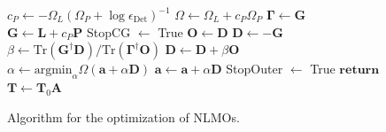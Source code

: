 \documentclass[aps,prl,reprint,amsmath,amssymb]{revtex4-1}
\begin{document}
\begin{figure}
\begin{algorithm}[H]
\begin{algorithmic}[1]
				\State $c_{P} \gets - \Omega_{L}(\Omega_P + \log \epsilon_{\text{Det}})^{-1}$ 
			\EndIf
			\State $\Omega \gets \Omega_{L} + c_P \Omega_{P} $ 
				\State $\mathbf{\Gamma} \gets \mathbf{G}$ 
			\EndIf 
			\State $\mathbf{G} \gets \mathbf{L} + c_P \mathbf{P} $ 
				\State StopCG $\gets$ True
			\EndIf
					\State $\mathbf{O} \gets \mathbf{D}$ 
				\EndIf
				\State $\mathbf{D} \gets - \mathbf{G}$ 
					\State $\beta \gets \text{Tr}(\mathbf{G}^{\dagger} \mathbf{D})/\text{Tr}(\mathbf{\Gamma}^{\dagger}\mathbf{O})$
					\State $\mathbf{D} \gets \mathbf{D} + \beta \mathbf{O}$ 
				\EndIf 
				\State $\alpha \gets \text{argmin}_{\alpha} \Omega(\mathbf{a} + \alpha \mathbf{D})$ 
				\State $\mathbf{a}\gets \mathbf{a} + \alpha \mathbf{D}$ 
			\EndIf
			\State StopOuter $\gets$ True
		\EndIf
	\State $\mathbf{return}$ $\mathbf{T} \gets \mathbf{T}_0 \mathbf{A} $ 
   \end{algorithmic}
\end{algorithm}
\caption{\label{fig:cg} Algorithm for the optimization of NLMOs.}
\end{figure}
\end{document}
